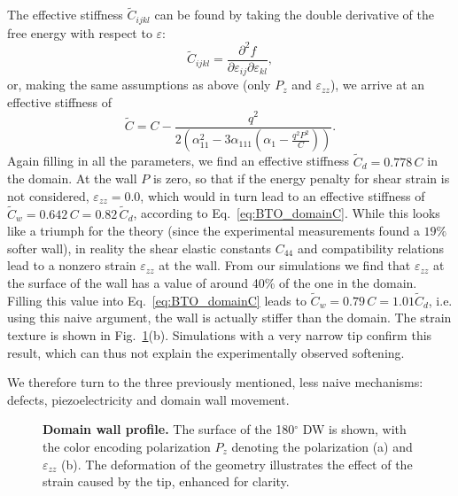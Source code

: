 The effective stiffness $\tilde{C}_{ijkl}$ can be found by taking the double derivative of the free energy with respect to $\varepsilon$:
\begin{equation}
	\tilde{C}_{ijkl} = \frac{\partial^2 f}{\partial \varepsilon_{ij} \partial \varepsilon_{kl}},
\end{equation}
or, making the same assumptions as above (only $P_z$ and $\varepsilon_{zz}$), we arrive at an effective stiffness of
\begin{equation}
	\label{eq:BTO_domainC}
	\tilde{C} = C - \frac{q^2}{2\left(\alpha_{11}^2 - 3 \alpha_{111}\left(\alpha_1  - \frac{q^2 P^2}{C}\right)\right)}.
\end{equation}
Again filling in all the parameters, we find an effective stiffness $\tilde{C}_d = 0.778 \,C$ in the domain.
At the wall $P$ is zero, so that if the energy penalty for shear strain is not considered, $\varepsilon_{zz} = 0.0$, which would in turn lead to an effective stiffness of $\tilde{C}_w = 0.642 \, C = 0.82\, \tilde{C}_d$, according to Eq.~\eqref{eq:BTO_domainC}.
While this looks like a triumph for the theory (since the experimental measurements found a $19\%$ softer wall), in reality the shear elastic constants $C_{44}$ and compatibility relations lead to a nonzero strain $\varepsilon_{zz}$ at the wall.
From our simulations we find that $\varepsilon_{zz}$ at the surface of the wall has a value of around 40\% of the one in the domain.
Filling this value into Eq.~\eqref{eq:BTO_domainC} leads to $\tilde{C}_w = 0.79 \, C = 1.01 \tilde{C}_d$, i.e. using this naive argument, the wall is actually stiffer than the domain.
The strain texture is shown in Fig.~\ref{fig:BTO_wall}(b).
Simulations with a very narrow tip confirm this result, which can thus not explain the experimentally observed softening.

We therefore turn to the three previously mentioned, less naive mechanisms: defects, piezoelectricity and domain wall movement.

\begin{figure}[h]
	\caption{\label{fig:BTO_wall} {\bf Domain wall profile.} The surface of the 180$^\circ$ DW is shown, with the color encoding polarization $P_z$ denoting the polarization (a) and $\varepsilon_{zz}$ (b). The deformation of the geometry illustrates the effect of the strain caused by the tip, enhanced for clarity.}
\end{figure}


